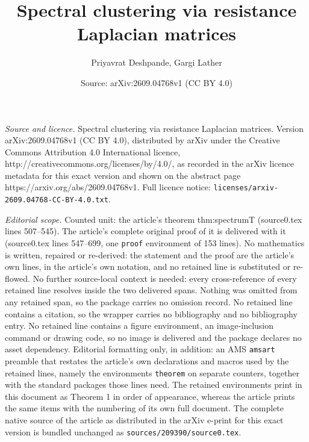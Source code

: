 \documentclass[10pt,a4paper]{amsart}
\title{Spectral clustering via resistance Laplacian matrices}
\author{Priyavrat Deshpande, Gargi Lather}
\date{Source: arXiv:2609.04768v1 (CC BY 4.0)}
\begin{document}
\maketitle

\noindent\emph{Source and licence.} Spectral clustering via resistance Laplacian matrices. Version arXiv:2609.04768v1 (CC BY 4.0), distributed by arXiv under the Creative Commons Attribution 4.0 International licence, http://creativecommons.org/licenses/by/4.0/, as recorded in the arXiv licence metadata for this exact version and shown on the abstract page https://arxiv.org/abs/2609.04768v1. Full licence notice: \texttt{licenses/arxiv-2609.04768-CC-BY-4.0.txt}.\par\smallskip

\noindent\textit{Editorial scope.} Counted unit: the article's theorem thm:spectrumT (source0.tex lines 507--545). The article's complete original proof of it is delivered with it (source0.tex lines 547--699, one \texttt{proof} environment of 153 lines). No mathematics is written, repaired or re-derived: the statement and the proof are the article's own lines, in the article's own notation, and no retained line is substituted or re-flowed.  No further source-local context is needed: every cross-reference of every retained line resolves inside the two delivered spans.  Nothing was omitted from any retained span, so the package carries no omission record.  No retained line contains a citation, so the wrapper carries no bibliography and no bibliography entry.  No retained line contains a figure environment, an image-inclusion command or drawing code, so no image is delivered and the package declares no asset dependency.  Editorial formatting only, in addition: an AMS \texttt{amsart} preamble that restates the article's own declarations and macros used by the retained lines, namely the environments \texttt{theorem} on separate counters, together with the standard packages those lines need.  The retained environments print in this document as Theorem 1 in order of appearance, whereas the article prints the same items with the numbering of its own full document.  The complete native source of the article as distributed in the arXiv e-print for this exact version is bundled unchanged as \texttt{sources/209390/source0.tex}.
\end{document}
